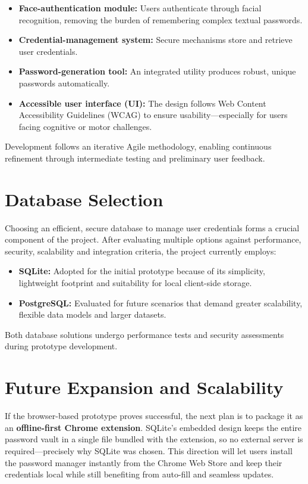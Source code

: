 \begin{itemize}
  \item \textbf{Face-authentication module:} Users authenticate through facial recognition, removing the burden of remembering complex textual passwords.
  \item \textbf{Credential-management system:} Secure mechanisms store and retrieve user credentials.
  \item \textbf{Password-generation tool:} An integrated utility produces robust, unique passwords automatically.
  \item \textbf{Accessible user interface (UI):} The design follows Web Content Accessibility Guidelines (WCAG) to ensure usability—especially for users facing cognitive or motor challenges.
\end{itemize}

Development follows an iterative Agile methodology, enabling continuous refinement through intermediate testing and preliminary user feedback.

\section{Database Selection}
Choosing an efficient, secure database to manage user credentials forms a crucial component of the project. After evaluating multiple options against performance, security, scalability and integration criteria, the project currently employs:

\begin{itemize}
  \item \textbf{SQLite:} Adopted for the initial prototype because of its simplicity, lightweight footprint and suitability for local client-side storage.
  \item \textbf{PostgreSQL:} Evaluated for future scenarios that demand greater scalability, flexible data models and larger datasets.
\end{itemize}

Both database solutions undergo performance tests and security assessments during prototype development.

\section{Future Expansion and Scalability}
If the browser-based prototype proves successful, the next plan is to
package it as an \textbf{offline-first Chrome extension}.  
SQLite's embedded design keeps the entire password vault in a single file
bundled with the extension, so no external server is required—precisely why
SQLite was chosen.  This direction will let users install the password manager
instantly from the Chrome Web Store and keep their credentials local while
still benefiting from auto-fill and seamless updates.

